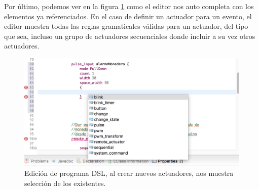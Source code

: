 Por último, podemos ver en la figura \ref{fig:dsl_autocompletado_4}  como el editor nos auto completa con los elementos ya referenciados. En el caso de definir un actuador para un evento, el editor muestra todas las reglas gramaticales válidas para un actuador, del tipo que sea, incluso un grupo de actuadores secuenciales donde incluir a su vez otros actuadores.

\begin{figure}
	\centering
    \includegraphics[scale=0.4]{images/emf_capturas/autocompletado_dsl_4.png}
    \sourcepropia{}
    \caption[Editor DSL - Autocompletado de variables]{Edición de programa DSL, al crear nuevos actuadores, nos muestra selección de los existentes.}
    \label{fig:dsl_autocompletado_4}
\end{figure}
